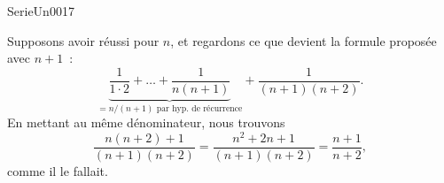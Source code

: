 

\begin{corrige}{SerieUn0017}

	Supposons avoir réussi pour $n$, et regardons ce que devient la formule proposée avec $n+1$~:
	\begin{equation}
		\underbrace{\frac{1}{ 1\cdot 2}+\ldots+\frac{1}{ n(n+1) }}_{\text{$=n/(n+1)$ par hyp. de récurrence}}+\frac{1}{ (n+1)(n+2) }.
	\end{equation}
	En mettant au même dénominateur, nous trouvons
	\begin{equation}
		\frac{ n(n+2)+1 }{ (n+1)(n+2) }=\frac{ n^2+2n+1 }{ (n+1)(n+2) }=\frac{ n+1 }{ n+2 },
	\end{equation}
	comme il le fallait.

\end{corrige}
